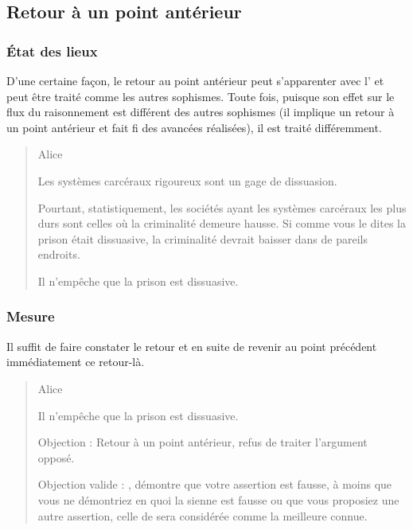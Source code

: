 \subsection{Retour à un point antérieur}
\subsubsection{État des lieux}
D’une certaine façon, le retour au point antérieur peut s’apparenter avec l’ et peut être traité comme les autres sophismes. Toute fois, puisque son effet sur le flux du raisonnement est différent des autres sophismes (il implique un retour à un point antérieur et fait fi des avancées réalisées), il est traité différemment.

\begin{quote}
  \begin{drama}{0cm}{0cm}{Alice}

    \Aspeaks       Les systèmes carcéraux rigoureux sont un gage de dissuasion.

    \Bspeaks       Pourtant, statistiquement, les sociétés ayant les systèmes carcéraux les plus durs sont celles où la criminalité demeure hausse. Si comme vous le dites la prison était dissuasive, la criminalité devrait baisser dans de pareils endroits.

    \Aspeaks       Il n’empêche que la prison est dissuasive.

  \end{drama}
\end{quote}

\subsubsection{Mesure}
Il suffit de faire constater le retour et en suite de revenir au point précédent immédiatement ce retour-là.
\begin{quote}
  \begin{drama}{0cm}{0cm}{Alice}

    \Aspeaks       Il n’empêche que la prison est dissuasive.

    \Bspeaks       Objection : Retour à un point antérieur, refus de traiter l’argument opposé.

    \Arbitrespeaks Objection valide : \A, \B démontre que votre assertion est fausse, à moins que vous ne démontriez en quoi la sienne est fausse ou que vous proposiez une autre assertion, celle de \B sera considérée comme la meilleure connue.

  \end{drama}
\end{quote}

